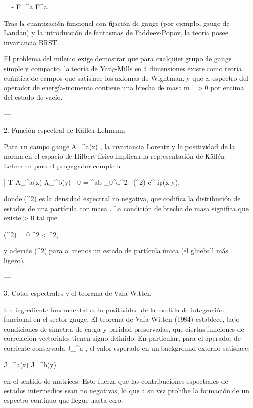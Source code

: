 \documentclass[12pt,twoside]{book}
\begin{document}
 = - F_{\mu\nu}^a F^{\mu\nu a}.
\]  

Tras la cuantización funcional con fijación de gauge (por ejemplo, gauge de Landau) y la introducción de fantasmas de Faddeev-Popov, la teoría posee invariancia BRST.

El problema del milenio exige demostrar que para cualquier grupo de gauge simple y compacto, la teoría de Yang-Mills en 4 dimensiones existe como teoría cuántica de campos que satisface los axiomas de Wightman, y que el espectro del operador de energía-momento contiene una brecha de masa  m_{} > 0  por encima del estado de vacío.

---

2. Función espectral de Källén-Lehmann

Para un campo gauge  A_\mu^a(x) , la invariancia Lorentz y la positividad de la norma en el espacio de Hilbert físico implican la representación de Källén-Lehmann para el propagador completo:

 | T A_\mu^a(x) A_\nu^b(y) | 0 \rangle = \delta^{ab} \int_0^\infty d\mu^2 \, \rho(\mu^2) \int {}  e^{-ip\cdot(x-y)},
\]  

donde  \rho(\mu^2)   es la densidad espectral no negativa, que codifica la distribución de estados de una partícula con masa  \mu . La condición de brecha de masa significa que existe  \Delta > 0  tal que

\rho(\mu^2) = 0 \quad {}  \le \mu^2 < \Delta^2,
\]  

y además  \rho(\Delta^2)   para al menos un estado de partícula única (el glueball más ligero).

---

3. Cotas espectrales y el teorema de Vafa-Witten

Un ingrediente fundamental es la positividad de la medida de integración funcional en el sector gauge. El teorema de Vafa-Witten (1984) establece, bajo condiciones de simetría de carga y paridad preservadas, que ciertas funciones de correlación vectoriales tienen signo definido. En particular, para el operador de corriente conservada  J_\mu^a , el valor esperado en un background externo satisface:

\left\langle J_\mu^a(x) J_\nu^b(y) \right\rangle {}
\]  

en el sentido de matrices. Esto fuerza que las contribuciones espectrales de estados intermedios sean no negativas, lo que a su vez prohíbe la formación de un espectro continuo que llegue hasta cero.
\end{document}
